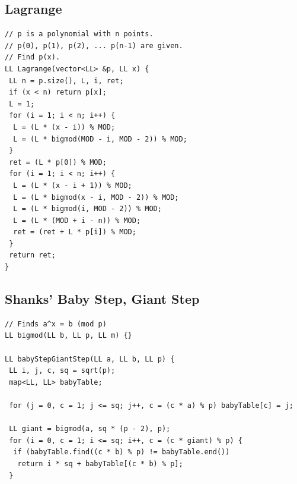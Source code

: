 \documentclass[a4paper,11pt,oneside]{article}
\begin{document}
\begin{multicols*}{\COLS}

\subsection{Lagrange}
\begin{lstlisting}
// p is a polynomial with n points.
// p(0), p(1), p(2), ... p(n-1) are given.
// Find p(x).
LL Lagrange(vector<LL> &p, LL x) {
 LL n = p.size(), L, i, ret;
 if (x < n) return p[x];
 L = 1;
 for (i = 1; i < n; i++) {
  L = (L * (x - i)) % MOD;
  L = (L * bigmod(MOD - i, MOD - 2)) % MOD;
 }
 ret = (L * p[0]) % MOD;
 for (i = 1; i < n; i++) {
  L = (L * (x - i + 1)) % MOD;
  L = (L * bigmod(x - i, MOD - 2)) % MOD;
  L = (L * bigmod(i, MOD - 2)) % MOD;
  L = (L * (MOD + i - n)) % MOD;
  ret = (ret + L * p[i]) % MOD;
 }
 return ret;
}
\end{lstlisting}
\subsection{Shanks' Baby Step, Giant Step}
\begin{lstlisting}
// Finds a^x = b (mod p)
LL bigmod(LL b, LL p, LL m) {}

LL babyStepGiantStep(LL a, LL b, LL p) {
 LL i, j, c, sq = sqrt(p);
 map<LL, LL> babyTable;

 for (j = 0, c = 1; j <= sq; j++, c = (c * a) % p) babyTable[c] = j;

 LL giant = bigmod(a, sq * (p - 2), p);
 for (i = 0, c = 1; i <= sq; i++, c = (c * giant) % p) {
  if (babyTable.find((c * b) % p) != babyTable.end())
   return i * sq + babyTable[(c * b) % p];
 }


\end{lstlisting}
\end{multicols*}
\end{document}
